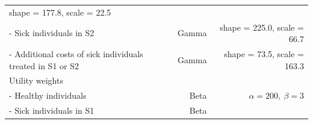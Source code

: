 \documentclass[
]{article}
\begin{document}
\begin{longtable}[]{@{}lrr@{}}
\begin{minipage}[t]{0.42\columnwidth}
shape = 177.8, scale = 22.5\strut
\end{minipage}\tabularnewline
\begin{minipage}[t]{0.32\columnwidth}\raggedright
- Sick individuals in S2\strut
\end{minipage} & \begin{minipage}[t]{0.17\columnwidth}\raggedleft
Gamma\strut
\end{minipage} & \begin{minipage}[t]{0.42\columnwidth}\raggedleft
shape = 225.0, scale = 66.7\strut
\end{minipage}\tabularnewline
\begin{minipage}[t]{0.32\columnwidth}\raggedright
- Additional costs of sick individuals treated in S1 or S2\strut
\end{minipage} & \begin{minipage}[t]{0.17\columnwidth}\raggedleft
Gamma\strut
\end{minipage} & \begin{minipage}[t]{0.42\columnwidth}\raggedleft
shape = 73.5, scale = 163.3\strut
\end{minipage}\tabularnewline
\begin{minipage}[t]{0.32\columnwidth}\raggedright
Utility weights\strut
\end{minipage} & \begin{minipage}[t]{0.17\columnwidth}\raggedleft
\strut
\end{minipage} & \begin{minipage}[t]{0.42\columnwidth}\raggedleft
\strut
\end{minipage}\tabularnewline
\begin{minipage}[t]{0.32\columnwidth}\raggedright
- Healthy individuals\strut
\end{minipage} & \begin{minipage}[t]{0.17\columnwidth}\raggedleft
Beta\strut
\end{minipage} & \begin{minipage}[t]{0.42\columnwidth}\raggedleft
\(\alpha = 200, \ \beta = 3\)\strut
\end{minipage}\tabularnewline
\begin{minipage}[t]{0.32\columnwidth}\raggedright
- Sick individuals in S1\strut
\end{minipage} & \begin{minipage}[t]{0.17\columnwidth}\raggedleft
Beta\strut
\end{minipage} & \begin{minipage}[t]{0.42\columnwidth}\raggedleft

\end{minipage}
\end{longtable}
\end{document}

